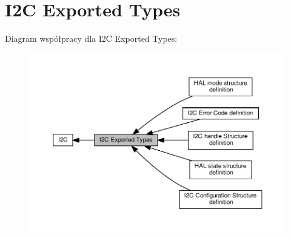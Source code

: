 \hypertarget{group___i2_c___exported___types}{}\section{I2C Exported Types}
\label{group___i2_c___exported___types}
Diagram współpracy dla I2C Exported Types\+:\nopagebreak
\begin{figure}[H]
\begin{center}
\leavevmode
\includegraphics[width=350pt]{group___i2_c___exported___types}
\end{center}
\end{figure}
